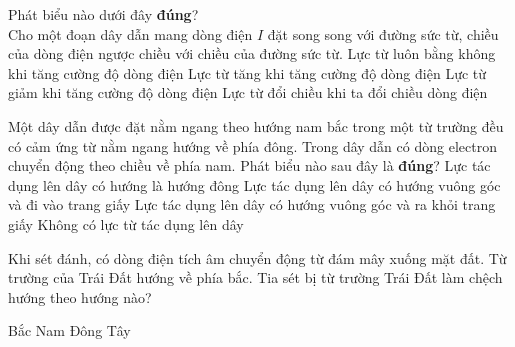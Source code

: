 \begin{ex}
	Phát biểu nào dưới đây \textbf{đúng}?\\
	Cho một đoạn dây dẫn mang dòng điện $I$ đặt song song với đường sức từ, chiều của dòng điện ngược chiều với chiều của đường sức từ.
	\choice
	{\True Lực từ luôn bằng không khi tăng cường độ dòng điện}
	{Lực từ tăng khi tăng cường độ dòng điện}
	{Lực từ giảm khi tăng cường độ dòng điện}
	{Lực từ đổi chiều khi ta đổi chiều dòng điện}
	\loigiai{}
\end{ex}
\begin{ex}
	Một dây dẫn được đặt nằm ngang theo hướng nam bắc trong một từ trường đều có cảm ứng từ nằm ngang hướng về phía đông. Trong dây dẫn có dòng electron chuyển động theo chiều về phía nam. Phát biểu nào sau đây là \textbf{đúng}?
	\choice
	{Lực tác dụng lên dây có hướng là hướng đông}
	{\True Lực tác dụng lên dây có hướng vuông góc và đi vào trang giấy}
	{Lực tác dụng lên dây có hướng vuông góc và ra khỏi trang giấy}
	{Không có lực từ tác dụng lên dây}
	\loigiai{}
\end{ex}
\begin{ex}
Khi sét đánh, có dòng điện tích âm chuyển động từ đám mây xuống mặt đất. Từ trường của Trái Đất hướng về phía bắc. Tia sét bị từ trường Trái Đất làm chệch hướng theo hướng nào?
	
	\choice
	{Bắc}
	{Nam}
	{Đông}
	{\True Tây}
\end{ex}

